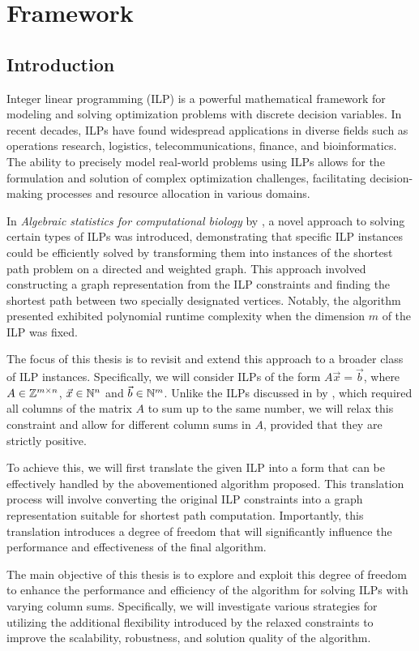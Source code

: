 \chapter{Framework}
\section{Introduction}
Integer linear programming (ILP) is a powerful mathematical framework for modeling and solving optimization problems with discrete decision variables. In recent decades, ILPs have found widespread applications in diverse fields such as operations research, logistics, telecommunications, finance, and bioinformatics. The ability to precisely model real-world problems using ILPs allows for the formulation and solution of complex optimization challenges, facilitating decision-making processes and resource allocation in various domains.

In \textit{Algebraic statistics for computational biology} by \cite{algebraic_statistics}, a novel approach to solving certain types of ILPs was introduced, demonstrating that specific ILP instances could be efficiently solved by transforming them into instances of the shortest path problem on a directed and weighted graph. This approach involved constructing a graph representation from the ILP constraints and finding the shortest path between two specially designated vertices. Notably, the algorithm presented exhibited polynomial runtime complexity when the dimension $m$ of the ILP was fixed.

The focus of this thesis is to revisit and extend this approach to a broader class of ILP instances. Specifically, we will consider ILPs of the form $A\vec x = \vec b$, where $A\in \mathbb{Z}^{m \times n}$,  $\vec x \in \mathbb{N}^n$ and $\vec b \in \mathbb{N}^m$. Unlike the ILPs discussed in by \cite{algebraic_statistics}, which required all columns of the matrix $A$ to sum up to the same number, we will relax this constraint and allow for different column sums in $A$, provided that they are strictly positive.

To achieve this, we will first translate the given ILP into a form that can be effectively handled by the abovementioned algorithm proposed. This translation process will involve converting the original ILP constraints into a graph representation suitable for shortest path computation. Importantly, this translation introduces a degree of freedom that will significantly influence the performance and effectiveness of the final algorithm.

The main objective of this thesis is to explore and exploit this degree of freedom to enhance the performance and efficiency of the algorithm for solving ILPs with varying column sums. Specifically, we will investigate various strategies for utilizing the additional flexibility introduced by the relaxed constraints to improve the scalability, robustness, and solution quality of the algorithm.

